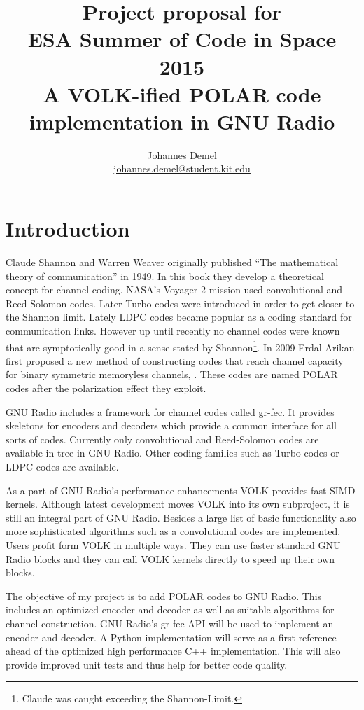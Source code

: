 \documentclass[a4paper,12pt]{scrartcl}
\title{Project proposal for\\
ESA Summer of Code in Space 2015\\
A VOLK-ified POLAR code implementation in GNU Radio
}
\author{Johannes Demel\\\href{mailto:johannes.demel@student.kit.edu}{johannes.demel@student.kit.edu}}
\begin{document}
\maketitle

\tableofcontents
\newpage

\section{Introduction}
Claude Shannon and Warren Weaver originally published ``The mathematical theory of communication'' \cite{shannon1998} in 1949.
In this book they develop a theoretical concept for channel coding.
NASA's Voyager 2 mission used convolutional and Reed-Solomon codes.
Later Turbo codes were introduced in order to get closer to the Shannon limit.
Lately LDPC codes became popular as a coding standard for communication links.
However up until recently no channel codes were known that are symptotically good in a sense stated by Shannon\footnote{Claude was caught exceeding the Shannon-Limit.}.
In 2009 Erdal Arikan first proposed a new method of constructing codes that reach channel capacity for binary symmetric memoryless channels, \cite{polar:arikan09}.
These codes are named POLAR codes after the polarization effect they exploit.

GNU Radio includes a framework for channel codes called gr-fec.
It provides skeletons for encoders and decoders which provide a common interface for all sorts of codes.
Currently only convolutional and Reed-Solomon codes are available in-tree in GNU Radio.
Other coding families such as Turbo codes or LDPC codes are available.

As a part of GNU Radio's performance enhancements VOLK provides fast SIMD kernels.
Although latest development moves VOLK into its own subproject, it is still an integral part of GNU Radio.
Besides a large list of basic functionality also more sophisticated algorithms such as a convolutional codes are implemented.
Users profit form VOLK in multiple ways.
They can use faster standard GNU Radio blocks and they can call VOLK kernels directly to speed up their own blocks.

The objective of my project is to add POLAR codes to GNU Radio.
This includes an optimized encoder and decoder as well as suitable algorithms for channel construction.
GNU Radio's gr-fec API will be used to implement an encoder and decoder. 
A Python implementation will serve as a first reference ahead of the optimized high performance C++ implementation.
This will also provide improved unit tests and thus help for better code quality.
\end{document}
